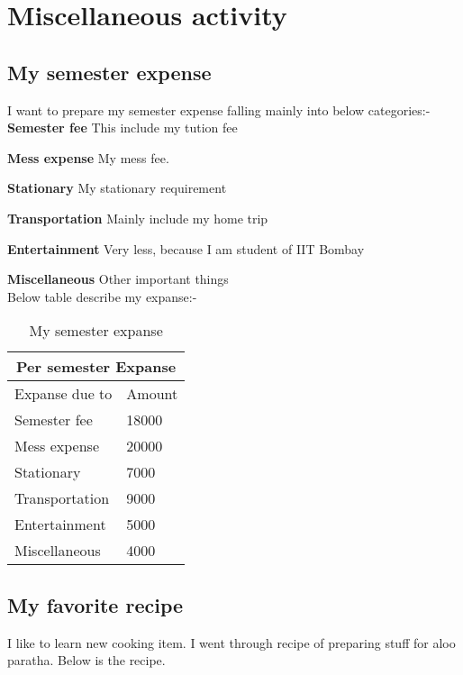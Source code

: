 \chapter{Miscellaneous activity}

\section{My semester expense}
I want to prepare my semester expense falling mainly into below categories:-
\\

\textbf{Semester fee} This include my tution fee

\textbf{Mess expense} My mess fee.

\textbf{Stationary} My stationary requirement

\textbf{Transportation} Mainly include my home trip

\textbf{Entertainment} Very less, because I am student of IIT Bombay

\textbf{Miscellaneous} Other important things
\\

Below table describe my expanse:-


\begin{table}[h!]
  \begin{center}
    \begin{tabular}{|p{4cm}|p{4cm}|}
      \hline
      \multicolumn{2}{|c|}{Per semester Expanse}\\
      \hline
      Expanse due to & Amount\\
	  \hline      
	  Semester fee & 18000\\
	  Mess expense & 20000\\
	  Stationary & 7000\\
	  Transportation & 9000\\
	  Entertainment & 5000\\
	  Miscellaneous & 4000\\
	\hline    
    \end{tabular}
    \caption{My semester expanse}
  \end{center}
\end{table}

\section{My favorite recipe}
I like to learn new cooking item. I went through recipe of preparing stuff for aloo
paratha. Below is the recipe.

